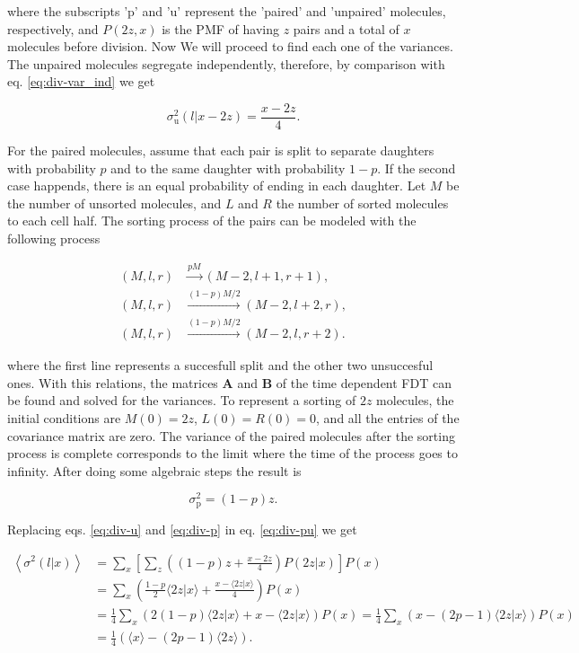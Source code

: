 where the subscripts 'p' and 'u' represent the 'paired' and 'unpaired' molecules, respectively, and $P(2z,x)$ is the PMF of having $z$ pairs and a total of $x$ molecules before division. Now We will proceed to find each one of the variances. The unpaired molecules segregate independently, therefore, by comparison with eq. \eqref{eq:div-var_ind} we get

\begin{equation}
  \label{eq:div-u}
  \sigma^2_\text{u}(l|x-2z) = \frac{x-2z}{4}.
\end{equation}

For the paired molecules, assume that each pair is split to separate daughters with probability $p$ and to the same daughter with probability $1-p$. If the second case happends, there is an equal probability of ending in each daughter. Let $M$ be the number of unsorted molecules, and $L$ and $R$ the number of sorted molecules to each cell half. The sorting process of the pairs can be modeled with the following process

\begin{equation*}
  \begin{split}
    (M,l,r)&\xrightarrow{pM}(M-2,l+1,r+1),\\
    (M,l,r)&\xrightarrow{(1-p)M/2}(M-2,l+2,r),\\
    (M,l,r)&\xrightarrow{(1-p)M/2}(M-2,l,r+2).
  \end{split}
\end{equation*}

where the first line represents a succesfull split and the other two unsuccesful ones. With this relations, the matrices $\mathbf{A}$ and $\mathbf{B}$ of the time dependent FDT can be found and solved for the variances. To represent a sorting of $2z$ molecules, the initial conditions are $M(0) = 2z$, $L(0) = R(0)=0$, and all the entries of the covariance matrix are zero. The variance of the paired molecules after the sorting process is complete corresponds to the limit where the time of the process goes to infinity. After doing some algebraic steps the result is

\begin{equation}
  \label{eq:div-p}
  \sigma^2_\text{p}=(1-p)z.
\end{equation}

Replacing eqs. \eqref{eq:div-u} and \eqref{eq:div-p} in eq. \eqref{eq:div-pu} we get

\begin{equation*}
  \begin{split}
    \left\langle\sigma^2(l|x)\right\rangle &=\sum_{x}\left[\sum_z\left((1-p)z+\frac{x-2z}{4}\right)P(2z|x)\right]P(x)\\
&=\sum_x\left(\frac{1-p}{2}\langle 2z|x\rangle+\frac{x-\langle 2z|x\rangle}{4}\right)P(x)\\
    &=\frac{1}{4}\sum_x\left(2(1-p)\langle 2z|x\rangle+x-\langle 2z|x\rangle\right)P(x) = \frac{1}{4}\sum_x\left(x-(2p-1)\langle 2z|x\rangle\right)P(x)\\
    &=\frac{1}{4}\left(\langle x\rangle - (2p-1)\langle 2z\rangle\right).
  \end{split}
\end{equation*}

